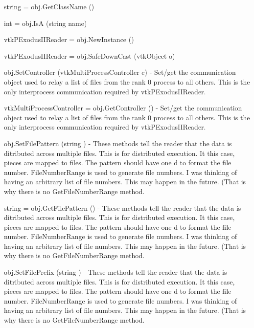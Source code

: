 \begin{DoxyItemize}
\item {\ttfamily string = obj.\-Get\-Class\-Name ()}  
\item {\ttfamily int = obj.\-Is\-A (string name)}  
\item {\ttfamily vtk\-P\-Exodus\-I\-I\-Reader = obj.\-New\-Instance ()}  
\item {\ttfamily vtk\-P\-Exodus\-I\-I\-Reader = obj.\-Safe\-Down\-Cast (vtk\-Object o)}  
\item {\ttfamily obj.\-Set\-Controller (vtk\-Multi\-Process\-Controller c)} -\/ Set/get the communication object used to relay a list of files from the rank 0 process to all others. This is the only interprocess communication required by vtk\-P\-Exodus\-I\-I\-Reader.  
\item {\ttfamily vtk\-Multi\-Process\-Controller = obj.\-Get\-Controller ()} -\/ Set/get the communication object used to relay a list of files from the rank 0 process to all others. This is the only interprocess communication required by vtk\-P\-Exodus\-I\-I\-Reader.  
\item {\ttfamily obj.\-Set\-File\-Pattern (string )} -\/ These methods tell the reader that the data is ditributed across multiple files. This is for distributed execution. It this case, pieces are mapped to files. The pattern should have one d to format the file number. File\-Number\-Range is used to generate file numbers. I was thinking of having an arbitrary list of file numbers. This may happen in the future. (That is why there is no Get\-File\-Number\-Range method.  
\item {\ttfamily string = obj.\-Get\-File\-Pattern ()} -\/ These methods tell the reader that the data is ditributed across multiple files. This is for distributed execution. It this case, pieces are mapped to files. The pattern should have one d to format the file number. File\-Number\-Range is used to generate file numbers. I was thinking of having an arbitrary list of file numbers. This may happen in the future. (That is why there is no Get\-File\-Number\-Range method.  
\item {\ttfamily obj.\-Set\-File\-Prefix (string )} -\/ These methods tell the reader that the data is ditributed across multiple files. This is for distributed execution. It this case, pieces are mapped to files. The pattern should have one d to format the file number. File\-Number\-Range is used to generate file numbers. I was thinking of having an arbitrary list of file numbers. This may happen in the future. (That is why there is no Get\-File\-Number\-Range method.  

\end{DoxyItemize}
